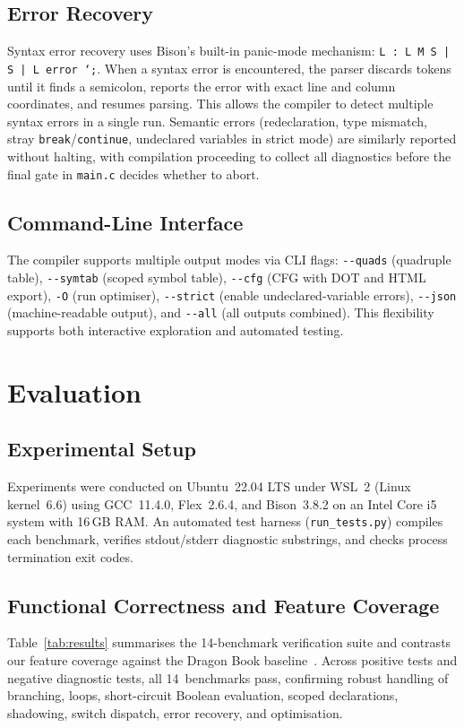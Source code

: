 \documentclass[conference]{IEEEtran}
\begin{document}
\subsection{Error Recovery}
Syntax error recovery uses Bison's built-in panic-mode mechanism: \texttt{L : L M S | S | L error `;\textquotesingle}. When a syntax error is encountered, the parser discards tokens until it finds a semicolon, reports the error with exact line and column coordinates, and resumes parsing. This allows the compiler to detect multiple syntax errors in a single run. Semantic errors (redeclaration, type mismatch, stray \texttt{break}/\texttt{continue}, undeclared variables in strict mode) are similarly reported without halting, with compilation proceeding to collect all diagnostics before the final gate in \texttt{main.c} decides whether to abort.

\subsection{Command-Line Interface}
The compiler supports multiple output modes via CLI flags: \texttt{-{}-quads} (quadruple table), \texttt{-{}-symtab} (scoped symbol table), \texttt{-{}-cfg} (CFG with DOT and HTML export), \texttt{-O} (run optimiser), \texttt{-{}-strict} (enable undeclared-variable errors), \texttt{-{}-json} (machine-readable output), and \texttt{-{}-all} (all outputs combined). This flexibility supports both interactive exploration and automated testing.

\section{Evaluation}
\label{sec:eval}

\subsection{Experimental Setup}
Experiments were conducted on Ubuntu~22.04 LTS under WSL~2 (Linux kernel~6.6) using GCC~11.4.0, Flex~2.6.4, and Bison~3.8.2 on an Intel Core i5 system with 16\,GB RAM. An automated test harness (\texttt{run\_tests.py}) compiles each benchmark, verifies stdout/stderr diagnostic substrings, and checks process termination exit codes.

\subsection{Functional Correctness and Feature Coverage}
Table~\ref{tab:results} summarises the 14-benchmark verification suite and contrasts our feature coverage against the Dragon Book baseline~\cite{dragonbook}. Across positive tests and negative diagnostic tests, all 14~benchmarks pass, confirming robust handling of branching, loops, short-circuit Boolean evaluation, scoped declarations, shadowing, switch dispatch, error recovery, and optimisation.
\end{document}
